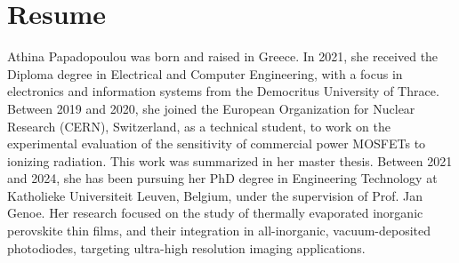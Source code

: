 \chapter{Resume}\label{ch:curriculum}

Athina Papadopoulou was born and raised in Greece. In 2021, she received the Diploma degree in Electrical and Computer Engineering, with a focus in electronics and information systems from the Democritus University of Thrace. Between 2019 and 2020, she joined the European Organization for Nuclear Research (CERN), Switzerland, as a technical student, to work on the experimental evaluation of the sensitivity of commercial power MOSFETs to ionizing radiation. This work was summarized in her master thesis. Between 2021 and 2024, she has been pursuing her PhD degree in Engineering Technology at Katholieke Universiteit Leuven, Belgium, under the supervision of Prof. Jan Genoe. Her research focused on the study of thermally evaporated inorganic perovskite thin films, and their integration in all-inorganic, vacuum-deposited photodiodes, targeting ultra-high resolution imaging applications. 


\cleardoublepage

